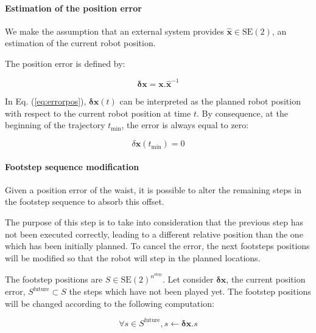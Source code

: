 \vspace{0.3cm}
\paragraph{Estimation of the position error}

We make the assumption that an external system provides
\mbox{$\hat{\mathbf{x}} \in \text{SE}(2)$}, an estimation of the
current robot position.

The position error is defined by:

\begin{equation} \label{eq:errorpos}
  \mathbf{\delta x} = \mathbf{x} . \hat{\mathbf{x}}^{-1}
\end{equation}

In Eq. (\ref{eq:errorpos}), $\mathbf{\delta x}(t)$ can be
interpreted as the planned robot position with respect to the current
robot position at time $t$. By consequence, at the beginning of the
trajectory $t_{\text{min}}$, the error is always equal to zero:

\begin{equation} \label{eq:errorpos_prop}
  \delta \mathbf{x}(t_{\text{min}}) = 0
\end{equation}

\vspace{0.3cm}
\paragraph{Footstep sequence modification}


Given a position error of the waist, it is possible to alter the
remaining steps in the footstep sequence to absorb this offset.

The purpose of this step is to take into consideration that the
previous step has not been executed correctly, leading to a different
relative position than the one which has been initially planned. To
cancel the error, the next footsteps positions will be modified
so that the robot will step in the planned locations.


The footstep positions are \mbox{$S \in
  \text{SE}(2)^{n^\text{step}}$}. Let consider $\mathbf{\delta {x}}$,
the current position error, \mbox{$S^{\text{future}} \subset S$} the
steps which have not been played yet. The footstep positions will be
changed according to the following computation:

\begin{equation} \label{eq:footstepmodif}
  \forall s \in S^{\text{future}}, s \gets \mathbf{\delta {x}} . s
\end{equation}


